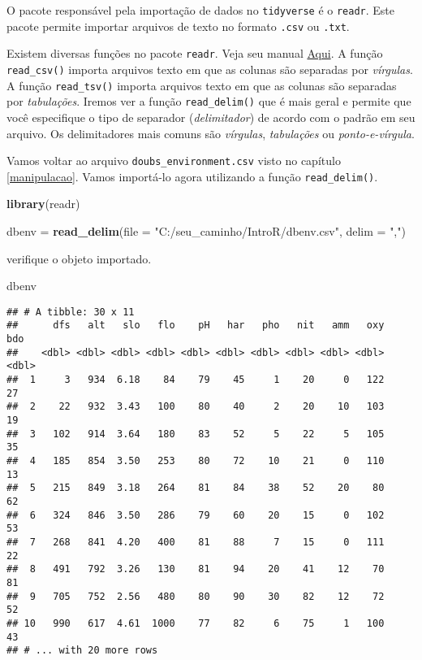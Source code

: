 \documentclass[
]{book}
\newenvironment{Shaded}{\begin{snugshade}}{\end{snugshade}}
\newcommand{\DataTypeTok}[1]{\textcolor[rgb]{0.13,0.29,0.53}{#1}}
\newcommand{\KeywordTok}[1]{\textcolor[rgb]{0.13,0.29,0.53}{\textbf{#1}}}
\newcommand{\NormalTok}[1]{#1}
\newcommand{\StringTok}[1]{\textcolor[rgb]{0.31,0.60,0.02}{#1}}
\begin{document}
O pacote responsável pela importação de dados no \texttt{tidyverse} é o \texttt{readr}. Este pacote permite importar arquivos de texto no formato \texttt{.csv} ou \texttt{.txt}.

Existem diversas funções no pacote \texttt{readr}. Veja seu manual \href{https://cran.r-project.org/web/packages/readr/index.html}{Aqui}. A função \texttt{read\_csv()} importa arquivos texto em que as colunas são separadas por \emph{vírgulas}. A função \texttt{read\_tsv()} importa arquivos texto em que as colunas são separadas por \emph{tabulações}. Iremos ver a função \texttt{read\_delim()} que é mais geral e permite que você especifique o tipo de separador (\emph{delimitador}) de acordo com o padrão em seu arquivo. Os delimitadores mais comuns são \emph{vírgulas}, \emph{tabulações} ou \emph{ponto-e-vírgula}.

Vamos voltar ao arquivo \texttt{doubs\_environment.csv} visto no capítulo \ref{manipulacao}. Vamos importá-lo agora utilizando a função \texttt{read\_delim()}.

\begin{Shaded}
\begin{Highlighting}[]
\KeywordTok{library}\NormalTok{(readr)}
\end{Highlighting}
\end{Shaded}

\begin{Shaded}
\begin{Highlighting}[]
\NormalTok{dbenv =}\StringTok{ }\KeywordTok{read_delim}\NormalTok{(}\DataTypeTok{file =} \StringTok{"C:/seu_caminho/IntroR/dbenv.csv"}\NormalTok{, }\DataTypeTok{delim =} \StringTok{","}\NormalTok{)}
\end{Highlighting}
\end{Shaded}

verifique o objeto importado.

\begin{Shaded}
\begin{Highlighting}[]
\NormalTok{dbenv}
\end{Highlighting}
\end{Shaded}

\begin{verbatim}
## # A tibble: 30 x 11
##      dfs   alt   slo   flo    pH   har   pho   nit   amm   oxy   bdo
##    <dbl> <dbl> <dbl> <dbl> <dbl> <dbl> <dbl> <dbl> <dbl> <dbl> <dbl>
##  1     3   934  6.18    84    79    45     1    20     0   122    27
##  2    22   932  3.43   100    80    40     2    20    10   103    19
##  3   102   914  3.64   180    83    52     5    22     5   105    35
##  4   185   854  3.50   253    80    72    10    21     0   110    13
##  5   215   849  3.18   264    81    84    38    52    20    80    62
##  6   324   846  3.50   286    79    60    20    15     0   102    53
##  7   268   841  4.20   400    81    88     7    15     0   111    22
##  8   491   792  3.26   130    81    94    20    41    12    70    81
##  9   705   752  2.56   480    80    90    30    82    12    72    52
## 10   990   617  4.61  1000    77    82     6    75     1   100    43
## # ... with 20 more rows
\end{verbatim}
\end{document}
